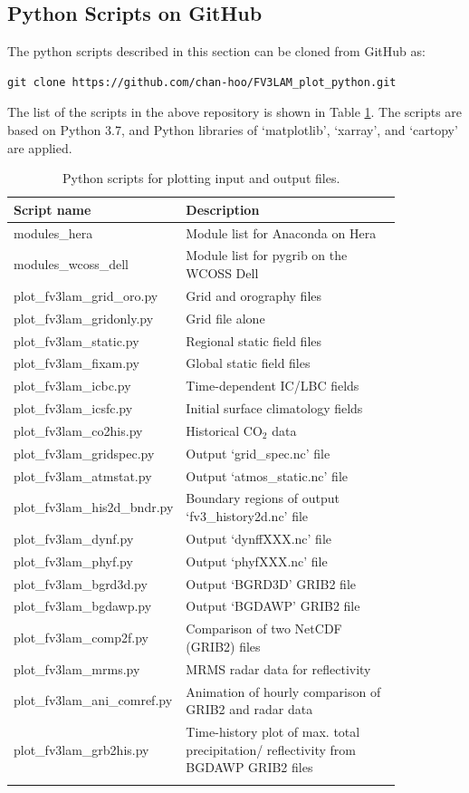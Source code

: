 \documentclass[11pt,fleqn]{report}              %
\begin{document}
\subsection{Python Scripts on GitHub}
\label{subsec:python_script_github}

The python scripts described in this section can be cloned from GitHub as:
\lstset{language=bash}   
\begin{lstlisting}[frame=trBL]
git clone https://github.com/chan-hoo/FV3LAM_plot_python.git
\end{lstlisting}

The list of the scripts in the above repository is shown in Table \ref{table:python_script_list}. The scripts are based on Python 3.7, and Python libraries of `matplotlib', `xarray', and `cartopy' are applied.

{
\fontsize{10}{12}\selectfont
\begin{longtable}{ p{0.25\linewidth} | p{0.6\linewidth} }
\hline
\hline
 Script name & Description \\
\hline
 modules\_hera & Module list for Anaconda on Hera \\
 modules\_wcoss\_dell & Module list for pygrib on the WCOSS Dell \\
 plot\_fv3lam\_grid\_oro.py & Grid and orography files \\
 plot\_fv3lam\_gridonly.py & Grid file alone \\
 plot\_fv3lam\_static.py & Regional static field files \\
 plot\_fv3lam\_fixam.py & Global static field files \\
 plot\_fv3lam\_icbc.py & Time-dependent IC/LBC fields \\
 plot\_fv3lam\_icsfc.py & Initial surface climatology fields \\
 plot\_fv3lam\_co2his.py & Historical CO$_2$ data \\
 plot\_fv3lam\_gridspec.py & Output `grid\_spec.nc' file \\
 plot\_fv3lam\_atmstat.py & Output `atmos\_static.nc' file \\
 plot\_fv3lam\_his2d\_bndr.py & Boundary regions of output `fv3\_history2d.nc' file \\
 plot\_fv3lam\_dynf.py & Output `dynffXXX.nc' file \\
 plot\_fv3lam\_phyf.py & Output `phyfXXX.nc' file \\
 plot\_fv3lam\_bgrd3d.py & Output `BGRD3D' GRIB2 file \\
 plot\_fv3lam\_bgdawp.py & Output `BGDAWP' GRIB2 file \\ 
 plot\_fv3lam\_comp2f.py & Comparison of two NetCDF (GRIB2) files \\
 plot\_fv3lam\_mrms.py & MRMS radar data for reflectivity \\
 plot\_fv3lam\_ani\_comref.py & Animation of hourly comparison of GRIB2 and radar data \\
 plot\_fv3lam\_grb2his.py & Time-history plot of max. total precipitation/ reflectivity from BGDAWP GRIB2 files \\
\hline
\caption{Python scripts for plotting input and output files.}
\label{table:python_script_list}
\end{longtable}
}
\end{document}
